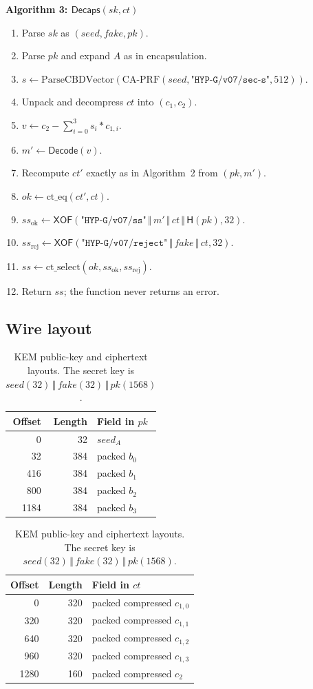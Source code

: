 \documentclass[runningheads]{llncs}
\newcommand{\concat}{\,\Vert\,}
\newcommand{\Hash}{\mathsf{H}}
\newcommand{\XOF}{\mathsf{XOF}}
\newcommand{\Decaps}{\mathsf{Decaps}}
\newcommand{\Decode}{\mathsf{Decode}}
\newenvironment{steps}[1]
  {\par\medskip\noindent\textbf{#1}\par\nopagebreak\small
   \begin{enumerate}[label=\arabic*:,leftmargin=*]}
  {\end{enumerate}\par\medskip}
\begin{document}
\begin{steps}{Algorithm 3: $\Decaps(sk,ct)$}
\item Parse $sk$ as $(\mathit{seed},\mathit{fake},pk)$.
\item Parse $pk$ and expand $A$ as in encapsulation.
\item $s\gets\mathrm{ParseCBDVector}(
  \mathrm{CA\text{-}PRF}(\mathit{seed},
  \texttt{"HYP-G/v07/sec-s"},512))$.
\item Unpack and decompress $ct$ into $(c_1,c_2)$.
\item $v\gets c_2-\sum_{i=0}^{3}s_i*c_{1,i}$.
\item $m'\gets\Decode(v)$.
\item Recompute $ct'$ exactly as in Algorithm~2 from $(pk,m')$.
\item $\mathit{ok}\gets\mathrm{ct\_eq}(ct',ct)$.
\item $ss_{\mathrm{ok}}\gets\XOF(
  \texttt{"HYP-G/v07/ss"}\concat m'\concat ct
  \concat\Hash(pk),32)$.
\item $ss_{\mathrm{rej}}\gets\XOF(
  \texttt{"HYP-G/v07/reject"}\concat\mathit{fake}\concat ct,32)$.
\item $ss\gets\mathrm{ct\_select}(\mathit{ok},
  ss_{\mathrm{ok}},ss_{\mathrm{rej}})$.
\item Return $ss$; the function never returns an error.
\end{steps}

\subsection{Wire layout}

\begin{table}[t]
\centering
\small
\begin{tabular}{@{}rrl@{}}
\toprule
Offset & Length & Field in $pk$ \\
\midrule
0 & 32 & $\mathit{seed}_A$ \\
32 & 384 & packed $b_0$ \\
416 & 384 & packed $b_1$ \\
800 & 384 & packed $b_2$ \\
1184 & 384 & packed $b_3$ \\
\bottomrule
\end{tabular}
\hfill
\begin{tabular}{@{}rrl@{}}
\toprule
Offset & Length & Field in $ct$ \\
\midrule
0 & 320 & packed compressed $c_{1,0}$ \\
320 & 320 & packed compressed $c_{1,1}$ \\
640 & 320 & packed compressed $c_{1,2}$ \\
960 & 320 & packed compressed $c_{1,3}$ \\
1280 & 160 & packed compressed $c_2$ \\
\bottomrule
\end{tabular}
\caption{KEM public-key and ciphertext layouts.  The secret key is
$\mathit{seed}(32)\concat\mathit{fake}(32)\concat pk(1568)$.}
\label{tab:kemwire}
\end{table}
\end{document}
